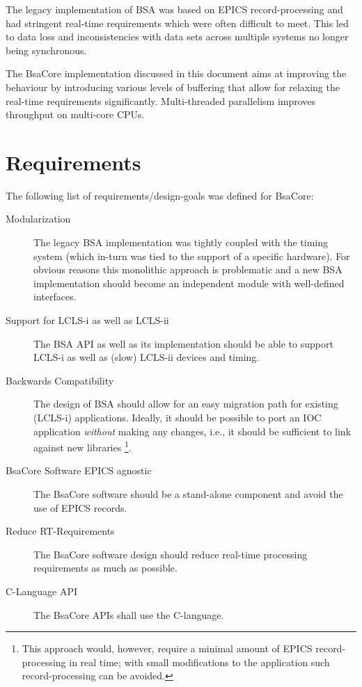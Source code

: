 \documentclass[11pt]{article}
\newcommand{\bsac}{BsaCore}
\newcommand{\bsa} {BSA}
\begin{document}
The legacy implementation of \bsa{} was based on EPICS record-processing and had stringent
real-time requirements which were often difficult to meet. This led to data loss and 
inconsistencies with data sets across multiple systems no longer being synchronous.

The \bsac{} implementation discussed in this document aims at improving the behaviour by
introducing various levels of buffering that allow for relaxing the real-time requirements
significantly. Multi-threaded parallelism improves throughput on multi-core CPUs.

\section{Requirements}
The following list of requirements/design-goals was defined for \bsac:
\begin{description}
\item[Modularization] The legacy \bsa{} implementation was tightly coupled with the timing
   system (which in-turn was tied to the support of a specific hardware). For obvious reasons
   this monolithic approach is problematic and a new \bsa{} implementation should become an
   independent module with well-defined interfaces.
\item[Support for LCLS-i as well as LCLS-ii] The \bsa{} API as well as its implementation should
   be able to support LCLS-i as well as (slow) LCLS-ii devices and timing.
\item[Backwards Compatibility] The design of \bsa{} should allow for an easy migration path for
   existing (LCLS-i) applications. Ideally, it should be possible to port an IOC application 
   {\em without} making any changes, i.e., it should be sufficient to link against new libraries%
\footnote{This approach would, however, require a minimal amount of EPICS record-processing in real
time; with small modifications to the application such record-processing can be avoided.}.
\item[\bsac{} Software EPICS agnostic] The \bsac{} software should be a stand-alone component and
   avoid the use of EPICS records.
\item[Reduce RT-Requirements] The \bsac{} software design should reduce real-time processing
   requirements as much as possible.
\item[C-Language API] The \bsac{} APIs shall use the C-language.
\end{description}
\end{document}
